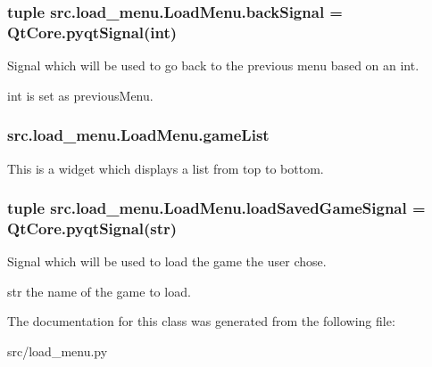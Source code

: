 \subsubsection[{back\+Signal}]{\setlength{\rightskip}{0pt plus 5cm}tuple src.\+load\+\_\+menu.\+Load\+Menu.\+back\+Signal = Qt\+Core.\+pyqt\+Signal(int)\hspace{0.3cm}{\ttfamily [static]}}\label{classsrc_1_1load__menu_1_1_load_menu_a213d15dc1a4c3b77947ea334896268c5}


Signal which will be used to go back to the previous menu based on an int. 

int is set as \textquotesingle{}previous\+Menu\textquotesingle{}. \hypertarget{classsrc_1_1load__menu_1_1_load_menu_af17d0436c9ca2ece0594fbcfd6380162}{}
\subsubsection[{game\+List}]{\setlength{\rightskip}{0pt plus 5cm}src.\+load\+\_\+menu.\+Load\+Menu.\+game\+List}\label{classsrc_1_1load__menu_1_1_load_menu_af17d0436c9ca2ece0594fbcfd6380162}


This is a widget which displays a list from top to bottom. 

\hypertarget{classsrc_1_1load__menu_1_1_load_menu_a9f994468ddeb9d648ce5a68c001fbb36}{}
\subsubsection[{load\+Saved\+Game\+Signal}]{\setlength{\rightskip}{0pt plus 5cm}tuple src.\+load\+\_\+menu.\+Load\+Menu.\+load\+Saved\+Game\+Signal = Qt\+Core.\+pyqt\+Signal(str)\hspace{0.3cm}{\ttfamily [static]}}\label{classsrc_1_1load__menu_1_1_load_menu_a9f994468ddeb9d648ce5a68c001fbb36}


Signal which will be used to load the game the user chose. 

str the name of the game to load. 

The documentation for this class was generated from the following file\+:\begin{DoxyCompactItemize}
\item 
src/load\+\_\+menu.\+py\end{DoxyCompactItemize}

